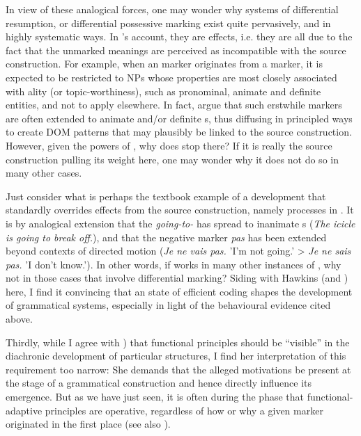 \documentclass[output=paper]{langsci/langscibook}
\begin{document}
In view of these analogical forces, one may wonder why systems of differential resumption,  or differential possessive marking exist quite pervasively, and in highly systematic ways. In ’s account, they are  effects, i.e. they are all due to the fact that the unmarked meanings are perceived as incompatible with the source construction. For example, when an  marker originates from a  marker, it is expected to be restricted to  NPs whose properties are most closely associated with ality (or topic-worthiness), such as pronominal, animate and definite entities, and not to apply elsewhere. In fact, \citet{DalrympleNikolaeva2011} argue that such erstwhile  markers are often extended to animate and/or definite s, thus diffusing in principled ways to create DOM patterns that may plausibly be linked to the source construction. However, given the powers of , why does  stop there? If it is really the source construction pulling its weight here, one may wonder why it does not do so in many other cases. 

\largerpage
Just consider what is perhaps the textbook example of a development that standardly overrides effects from the source construction, namely  processes in . It is by analogical extension that the \textit{going-to-} has spread to inanimate s (\textit{The icicle is going to break off.}), and that the  negative marker \textit{pas} has been extended beyond contexts of directed motion (\textit{Je ne vais pas.} 'I'm not going.' > \textit{Je ne sais pas.} 'I don't know.'). In other words, if  works in many other instances of , why not in those cases that involve differential marking? Siding with Hawkins (and ) here, I find it convincing that an  state of efficient coding shapes the development of grammatical systems, especially in light of the behavioural evidence cited above.

\largerpage
Thirdly, while I agree with ) that functional principles should be “visible” in the diachronic development of particular structures, I find her interpretation of this requirement too narrow: She demands that the alleged motivations be present at the  stage of a grammatical construction and hence directly influence its emergence. But as we have just seen, it is often during the  phase that functional-adaptive principles are operative, regardless of how or why a given marker originated in the first place (see also ). 
\end{document}

